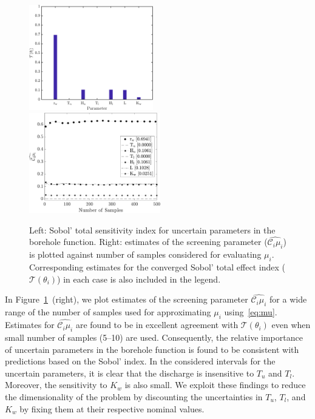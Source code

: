 \begin{figure}[htbp]
 \begin{center}
  \includegraphics[width=0.48\textwidth]{./Figures/sense_borehole}
  \includegraphics[width=0.51\textwidth]{./Figures/ub_conv_borehole}
\caption{
Left: Sobol' total sensitivity index for uncertain parameters in the borehole
function. Right: 
estimates of the screening parameter ($\widehat{\mathcal{C}_i\mu_i}$) is plotted
against number of samples considered for evaluating $\mu_i$. Corresponding estimates
for the converged Sobol' total effect index ($\mathcal{T}(\theta_i)$) in each case is also included in the
legend. }
\label{fig:sense_bore}
\end{center}
\end{figure}
In Figure~\ref{fig:sense_bore}~(right), we plot estimates of the screening parameter 
$\widehat{\mathcal{C}_i\mu_i}$ for a wide range of the number of 
samples used for approximating $\mu_i$ using~\eqref{eq:mu}.
Estimates for $\widehat{\mathcal{C}_i\mu_i}$ are found to be in excellent agreement with $\mathcal{T}(\theta_i)$ even when small number of samples (5--10) are used. 
Consequently, the relative importance of uncertain 
parameters in the borehole function is found to be consistent 
with predictions based on the Sobol' index. 
In the considered intervals for the uncertain parameters, it is clear 
that the discharge is insensitive to $T_u$ and $T_l$. 
Moreover, the sensitivity to $K_w$ is also small. We exploit these findings to reduce
the dimensionality of the problem by 
discounting the uncertainties in $T_u$, $T_l$, and $K_w$ by fixing 
them at their respective nominal values. 

